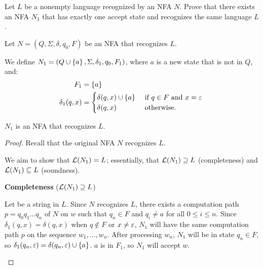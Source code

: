 \begin{problem}
  \begin{enumalph}
    \item Let $L$ be a nonempty language recognized by an NFA $N$.
      Prove that there exists an NFA $N_1$ that has exactly one accept state
      and recognizes the same language $L$.
      \begin{Answer}
        Let $N = (Q, \Sigma, \delta, q_0, F)$ be an NFA that recognizes $L$.
        
        \step
        We define $N_1 = (Q \cup \left\{a\right\}, \Sigma, \delta_1, q_0, F_1)$,
        where $a$ is a new state that is not in $Q$, and:
        \begin{align*}
          F_1 &= \left\{a\right\} \\
          \delta_1(q, x) &= \begin{cases}
            \delta(q, x) \cup \left\{a\right\} &\text{ if $q \in F$ and $x = \varepsilon$ }\\
            \delta(q, x) & \text{ otherwise. }
          \end{cases}
        \end{align*}
        \begin{claim}
          $N_1$ is an NFA that recognizes $L$.
          \begin{proof}
            Recall that the original NFA $N$ recognizes $L$.

            \step
            We aim to show that $\mathcal{L}(N_1) = L$;
            essentially, that $\mathcal{L}(N_1) \supseteq L$ (completeness)
            and $\mathcal{L}(N_1) \subseteq L$ (soundness).

            \begin{enumroman}
              \item \textbf{Completeness} ($\mathcal{L}(N_1) \supseteq L$)

                \step
                Let 
                be a string in $L$. Since $N$ recognizes $L$,
                there exists a computation path $p = q_0q_1\ldots q_n$
                of $N$ on $w$ such that $q_n \in F$ and $q_i \neq a$ for all $0 \le i \le n$.
                Since $\delta_1(q, x) = \delta(q, x)$ when $q \notin F$
                or $x \neq \varepsilon$, $N_1$ will have the same computation path $p$ on
                the sequence $w_1,\ldots, w_n$.
                After processing $w_n$, $N_1$ will be in state $q_n \in F$,
                so $\delta_1(q_n, \varepsilon) = \delta(q_n, \varepsilon) \cup \left\{a\right\}$.
                $a$ is in $F_1$, so $N_1$ will accept $w$.
                

\end{enumroman}
\end{proof}
\end{claim}
\end{Answer}
\end{enumalph}
\end{problem}
